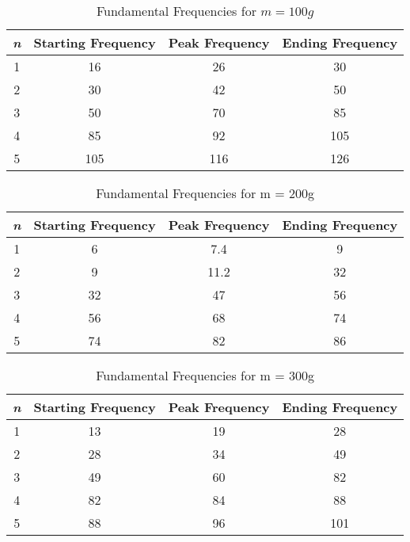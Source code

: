 

{}

\begin{table}[H]
    \centering
    \begin{tabular}{|c|c|c|c|}
    \hline
    \hline
        \textit{n} & Starting Frequency & Peak Frequency & Ending Frequency \\
        \hline
        \hline
        1 & 16 & 26 & 30 \\
        \hline
        2 & 30 & 42 & 50 \\ 
        \hline
        3 & 50 & 70 & 85 \\ 
        \hline
        4 & 85 & 92 & 105 \\ 
        \hline
        5 & 105 & 116 & 126 \\ 
        \hline
        \hline
    \end{tabular}
    \caption{Fundamental Frequencies for $m = 100g$}
\end{table}

\begin{table}[H]
    \centering
    \begin{tabular}{|c|c|c|c|}
    \hline
    \hline
        \textit{n} & Starting Frequency & Peak Frequency & Ending Frequency \\ 
        \hline
        \hline
        1 & 6 & 7.4 & 9 \\ 
        \hline
        2 & 9 & 11.2 & 32 \\ 
        \hline
        3 & 32 & 47 & 56 \\ 
        \hline
        4 & 56 & 68 & 74 \\ 
        \hline
        5 & 74 & 82 & 86 \\ 
        \hline
        \hline
    \end{tabular}
    \caption{Fundamental Frequencies for m = 200g}
\end{table}

\begin{table}[H]
    \centering
    \begin{tabular}{|c|c|c|c|}
    \hline
    \hline
        \textit{n} & Starting Frequency & Peak Frequency & Ending Frequency \\ 
        \hline
        \hline
        1 & 13 & 19 & 28 \\ 
        \hline
        2 & 28 & 34 & 49 \\ 
        \hline
        3 & 49 & 60 & 82 \\ 
        \hline
        4 & 82 & 84 & 88 \\ 
        \hline
        5 & 88 & 96 & 101 \\ 
        \hline
        \hline
    \end{tabular}
    \caption{Fundamental Frequencies for m = 300g}
\end{table}



